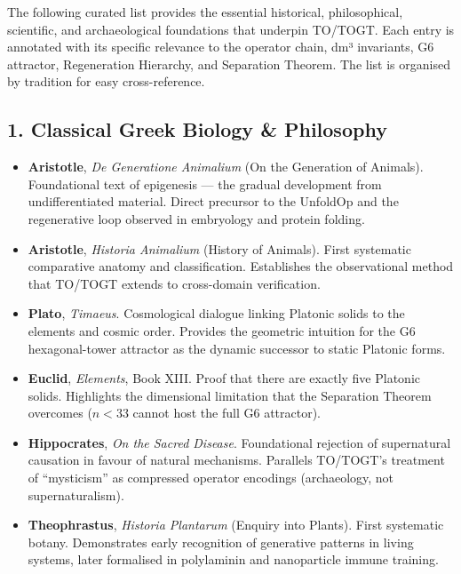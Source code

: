 \documentclass[19pt]{book}
\theoremstyle{plain}
\theoremstyle{definition}
\theoremstyle{remark}
\begin{document}
\begin{enumerate}
The following curated list provides the essential historical, philosophical, scientific, and archaeological foundations that underpin TO/TOGT. Each entry is annotated with its specific relevance to the operator chain, dm³ invariants, G6 attractor, Regeneration Hierarchy, and Separation Theorem. The list is organised by tradition for easy cross-reference.

\subsection{1. Classical Greek Biology \& Philosophy}

\begin{itemize}
\item \textbf{Aristotle}, \emph{De Generatione Animalium} (On the Generation of Animals).  
  Foundational text of epigenesis — the gradual development from undifferentiated material. Direct precursor to the UnfoldOp and the regenerative loop observed in embryology and protein folding.

\item \textbf{Aristotle}, \emph{Historia Animalium} (History of Animals).  
  First systematic comparative anatomy and classification. Establishes the observational method that TO/TOGT extends to cross-domain verification.

\item \textbf{Plato}, \emph{Timaeus}.  
  Cosmological dialogue linking Platonic solids to the elements and cosmic order. Provides the geometric intuition for the G6 hexagonal-tower attractor as the dynamic successor to static Platonic forms.

\item \textbf{Euclid}, \emph{Elements}, Book XIII.  
  Proof that there are exactly five Platonic solids. Highlights the dimensional limitation that the Separation Theorem overcomes (\(n < 33\) cannot host the full G6 attractor).

\item \textbf{Hippocrates}, \emph{On the Sacred Disease}.  
  Foundational rejection of supernatural causation in favour of natural mechanisms. Parallels TO/TOGT’s treatment of “mysticism” as compressed operator encodings (archaeology, not supernaturalism).

\item \textbf{Theophrastus}, \emph{Historia Plantarum} (Enquiry into Plants).  
  First systematic botany. Demonstrates early recognition of generative patterns in living systems, later formalised in polylaminin and nanoparticle immune training.
\end{itemize}


\end{enumerate}
\end{document}
